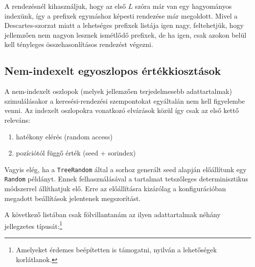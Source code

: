 \documentclass[
    parspace, %
    noindent, %
]{elteiktdk}[2023/10/30]
\begin{document}
A rendezésnél kihasználjuk, hogy az első $L$ szóra már van egy hagyományos indexünk,
így a prefixek egymáshoz képesti rendezése már megoldott.
Mivel a Descartes-szorzat miatt a lehetséges prefixek listája igen nagy,
feltehetjük, hogy jellemzően nem nagyon lesznek ismétlődő prefixek,
de ha igen, csak azokon belül kell tényleges összehasonlításos rendezést végezni.

\subsection{Nem-indexelt egyoszlopos értékkiosztások}

A nem-indexelt oszlopok (melyek jellemzően terjedelmesebb adattartalmak)
szimulálásakor a keresési-rendezési szempontokat egyáltalán nem kell figyelembe venni.
Az indexelt oszlopokra vonatkozó elvárások közül így csak az első kettő releváns:

\begin{enumerate}
  \item hatékony elérés (random access)
  \item pozíciótól függő érték (seed + sorindex)
\end{enumerate}

Vagyis elég, ha a \texttt{TreeRandom} által a sorhoz generált seed alapján
előállítunk egy \texttt{Random} példányt.
Ennek felhasználásával a tartalmat tetszőleges determinisztikus módszerrel állíthatjuk elő.
Erre az előállításra kizárólag a konfigurációban megadott beállítások jelentenek megszorítást.

A következő listában csak fölvillantanám az ilyen adattartalmak néhány jellegzetes típusát:\footnote{
  Amelyeket érdemes beépítetten is támogatni, nyilván a lehetőségek korlátlanok.
}
\end{document}
